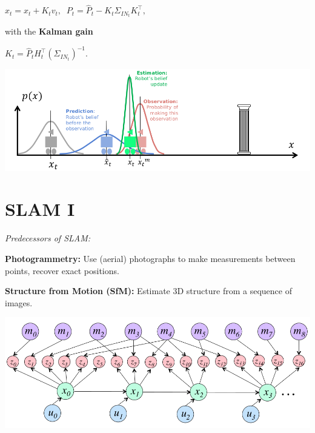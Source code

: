 \documentclass[landscape]{article}
\newcommand{\vmspace}{\vspace{-7pt}}
\newcommand{\vpspace}{\vspace{5pt}}
\begin{document}
\begin{multicols}{3}
\begin{minipage}{\columnwidth}
\begin{compactenum}
    \begin{center}
      $
      x_t = \hat x_t + K_t v_t,\;\;
      P_t = \hat P_t - K_t \Sigma_{IN_t}K_t^\intercal,
      $
    \end{center}

    with the \textbf{Kalman gain}

    \begin{center}
      $
      K_t = \hat P_t H_t^\intercal (\Sigma_{IN_t})^{-1}.
      $
    \end{center}

  \end{compactenum}
  \includegraphics[width=\columnwidth]{img/9_Kalman.png}
\end{minipage}



\vfill


\section{SLAM I}

\vmspace

\begin{minipage}{\columnwidth}
  \textit{Predecessors of SLAM:}
  \begin{compactitem}
  \item \textbf{Photogrammetry:} Use (aerial) photographs to make measurements
    between points, recover exact positions.
  \item \textbf{Structure from Motion (SfM):} Estimate 3D structure from a
    sequence of images.
  \end{compactitem}
\end{minipage}

\vpspace

\includegraphics[width=\columnwidth]{img/10_SLAM.png}


\end{multicols}
\end{document}
